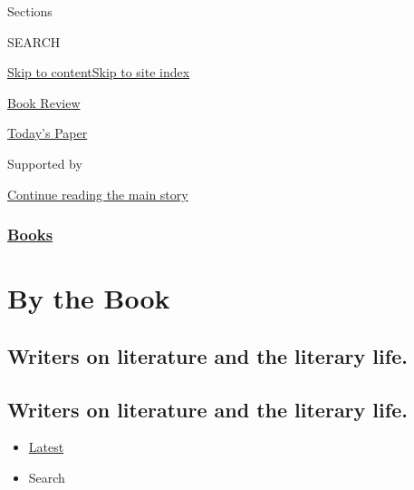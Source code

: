 Sections

SEARCH

\protect\hyperlink{site-content}{Skip to
content}\protect\hyperlink{site-index}{Skip to site index}

\href{https://www.nytimes3xbfgragh.onion/section/books/review}{Book
Review}

\href{https://myaccount.nytimes3xbfgragh.onion/auth/login?response_type=cookie\&client_id=vi}{}

\href{https://www.nytimes3xbfgragh.onion/section/todayspaper}{Today's
Paper}

Supported by

\protect\hyperlink{after-sponsor}{Continue reading the main story}

\hypertarget{books}{%
\subsubsection{\texorpdfstring{\href{/section/books}{Books}}{Books}}\label{books}}

\hypertarget{by-the-book}{%
\section{By the Book}\label{by-the-book}}

\hypertarget{writers-on-literature-and-the-literary-life}{%
\subsection{Writers on literature and the literary
life.}\label{writers-on-literature-and-the-literary-life}}

\hypertarget{writers-on-literature-and-the-literary-life-1}{%
\subsection{Writers on literature and the literary
life.}\label{writers-on-literature-and-the-literary-life-1}}

\begin{itemize}
\tightlist
\item
  \protect\hyperlink{stream-panel}{Latest}
\item
  Search
\end{itemize}

